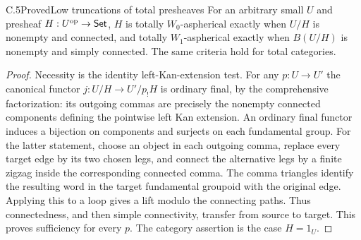 \begin{claim}{C.5}{Proved}{Low truncations of total presheaves}
\label{C:low-presheaves}
For an arbitrary small $U$ and presheaf $H:U^{\mathrm{op}}\to\mathsf{Set}$,
$H$ is totally $W_0$-aspherical exactly when $U/H$ is nonempty
and connected, and totally $W_1$-aspherical exactly when
$B(U/H)$ is nonempty and simply connected. The same criteria
hold for total categories.
\end{claim}
\begin{proof}
Necessity is the identity left-Kan-extension test. For any
$p:U\to U'$ the canonical functor
$j:U/H\to U'/p_!H$ is ordinary final, by the comprehensive
factorization: its outgoing commas are precisely the nonempty
connected components defining the pointwise left Kan extension.
An ordinary final functor induces a bijection on components and
surjects on each fundamental group. For the latter statement,
choose an object in each outgoing comma, replace every target edge
by its two chosen legs, and connect the alternative legs by a
finite zigzag inside the corresponding connected comma. The comma
triangles identify the resulting word in the target fundamental
groupoid with the original edge. Applying this to a loop gives a
lift modulo the connecting paths. Thus connectedness, and then
simple connectivity, transfer from source to target. This proves
sufficiency for every $p$. The category assertion is the case
$H=1_U$.
\end{proof}

